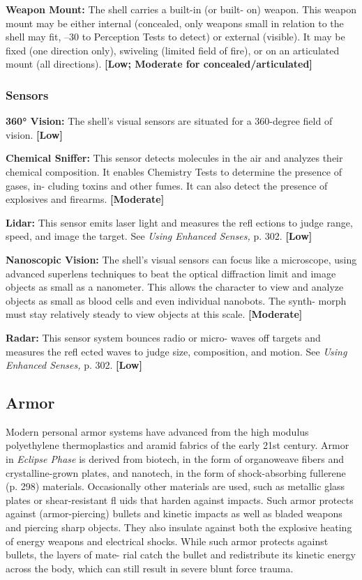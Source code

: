\textbf{Weapon Mount:} The shell carries a built-in (or built-
on) weapon. This weapon mount may be either internal 
(concealed, only weapons small in relation to the shell 
may fit, –30 to Perception Tests to detect) or external 
(visible). It may be fixed (one direction only), swiveling 
(limited field of fire), or on an articulated mount (all 
directions). \textbf{[Low; Moderate for concealed/articulated]}

\subsubsection{Sensors}

\textbf{360° Vision: }The shell's visual sensors are situated for 
a 360-degree field of vision. \textbf{[Low]}

\textbf{Chemical Sniffer:} This sensor detects molecules in the 
air and analyzes their chemical composition. It enables 
Chemistry Tests to determine the presence of gases, in-
cluding toxins and other fumes. It can also detect the 
presence of explosives and firearms. \textbf{[Moderate]}

\textbf{Lidar:} This sensor emits laser light and measures 
the refl ections to judge range, speed, and image the 
target. See \textit{Using Enhanced Senses,} p. 302. \textbf{[Low]}

\textbf{Nanoscopic Vision:} The shell's visual sensors can 
focus like a microscope, using advanced superlens 
techniques to beat the optical diffraction limit and 
image objects as small as a nanometer. This allows 
the character to view and analyze objects as small as 
blood cells and even individual nanobots. The synth-
morph must stay relatively steady to view objects at 
this scale. \textbf{[Moderate]}

\textbf{Radar:} This sensor system bounces radio or micro-
waves off targets and measures the refl ected waves 
to judge size, composition, and motion. See \textit{Using }
\textit{Enhanced Senses,} p. 302. \textbf{[Low]}

\subsection{Armor}

Modern personal armor systems have advanced from 
the high modulus polyethylene thermoplastics and 
aramid fabrics of the early 21st century. Armor in 
\textit{Eclipse Phase} is derived from biotech, in the form of 
organoweave fibers and crystalline-grown plates, and 
nanotech, in the form of shock-absorbing fullerene (p. 
298) materials. Occasionally other materials are used, 
such as metallic glass plates or shear-resistant fl uids 
that harden against impacts. Such armor protects 
against (armor-piercing) bullets and kinetic impacts 
as well as bladed weapons and piercing sharp objects. 
They also insulate against both the explosive heating 
of energy weapons and electrical shocks. While such 
armor protects against bullets, the layers of mate-
rial catch the bullet and redistribute its kinetic energy 
across the body, which can still result in severe blunt 
force trauma.

